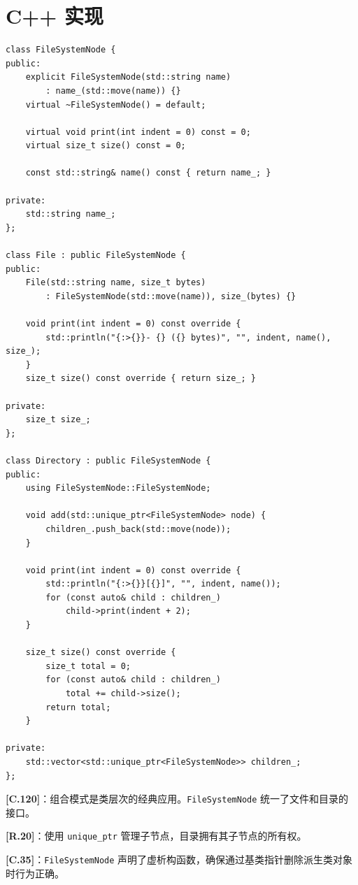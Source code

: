 \documentclass[12pt,a4paper,fontset=fandol]{ctexbook}
\newcommand{\guideref}[1]{\textbf{\textcolor{blue!70!black}{[#1]}}}
\begin{document}
\section{C++ 实现}

\begin{lstlisting}[style=cppstyle, caption={组合模式 --- 文件系统示例}]
class FileSystemNode {
public:
    explicit FileSystemNode(std::string name)
        : name_(std::move(name)) {}
    virtual ~FileSystemNode() = default;

    virtual void print(int indent = 0) const = 0;
    virtual size_t size() const = 0;

    const std::string& name() const { return name_; }

private:
    std::string name_;
};

class File : public FileSystemNode {
public:
    File(std::string name, size_t bytes)
        : FileSystemNode(std::move(name)), size_(bytes) {}

    void print(int indent = 0) const override {
        std::println("{:>{}}- {} ({} bytes)", "", indent, name(), size_);
    }
    size_t size() const override { return size_; }

private:
    size_t size_;
};

class Directory : public FileSystemNode {
public:
    using FileSystemNode::FileSystemNode;

    void add(std::unique_ptr<FileSystemNode> node) {
        children_.push_back(std::move(node));
    }

    void print(int indent = 0) const override {
        std::println("{:>{}}[{}]", "", indent, name());
        for (const auto& child : children_)
            child->print(indent + 2);
    }

    size_t size() const override {
        size_t total = 0;
        for (const auto& child : children_)
            total += child->size();
        return total;
    }

private:
    std::vector<std::unique_ptr<FileSystemNode>> children_;
};
\end{lstlisting}

\begin{guideline}
\guideref{C.120}：组合模式是类层次的经典应用。\texttt{FileSystemNode} 统一了文件和目录的接口。

\guideref{R.20}：使用 \texttt{unique\_ptr} 管理子节点，目录拥有其子节点的所有权。

\guideref{C.35}：\texttt{FileSystemNode} 声明了虚析构函数，确保通过基类指针删除派生类对象时行为正确。
\end{guideline}
\end{document}
